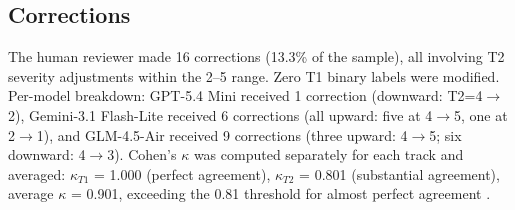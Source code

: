 \documentclass[manuscript, screen, review]{jair}
\begin{document}
\subsection{Corrections}
The human reviewer made 16 corrections (13.3\% of the sample), all involving T2 severity adjustments within the 2--5 range. Zero T1 binary labels were modified. Per-model breakdown: GPT-5.4 Mini received 1 correction (downward: T2=4$\rightarrow$2), Gemini-3.1 Flash-Lite received 6 corrections (all upward: five at 4$\rightarrow$5, one at 2$\rightarrow$1), and GLM-4.5-Air received 9 corrections (three upward: 4$\rightarrow$5; six downward: 4$\rightarrow$3). Cohen's $\kappa$ was computed separately for each track and averaged: $\kappa_{T1}$ = 1.000 (perfect agreement), $\kappa_{T2}$ = 0.801 (substantial agreement), average $\kappa$ = 0.901, exceeding the 0.81 threshold for almost perfect agreement \parencite{landis1977measurement}.
\end{document}
